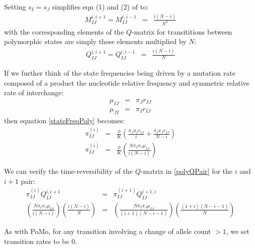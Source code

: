 \documentclass{llncs}
\newcommand{\polyProb}{\ensuremath{\phi}}}
\newcommand{\Knorm}{\ensuremath{K}}}
\newcommand{\pomo}{PoMo\xspace}
\begin{document}
Setting $s_I=s_J$ simplifies eqn (1) and (2) of \cite{DeMaioSK2013} to:
\begin{eqnarray}
 M_{IJ}^{i,i+1}  = M_{IJ}^{i,i-1} & = & \frac{i(N-i)}{N^2}
\end{eqnarray}
with the corresponding elements of the $Q$-matrix for 
    transititions between polymorphic states are simply
    these elements multiplied by $N$:
\begin{eqnarray}
    Q_{IJ}^{i,i+1}  = Q_{IJ}^{i,i-1} & = & \frac{i(N-i)}{N} \label{polyQPair}
\end{eqnarray}

If we further think of the state frequencies being driven by a mutation rate composed of a product
    the nucleotide relative frequency and symmetric relative rate of interchange:
\begin{eqnarray}
 \mu_{IJ} & = &\pi_J r_{IJ} \\
 \mu_{JI} & = &\pi_I r_{IJ} 
\end{eqnarray}
then equation \ref{stateFreqPoly} becomes:
\begin{eqnarray}
\pi_{IJ}^{(i)} & = & \frac{\polyProb}{\Knorm }\left( \frac{\pi_J\pi_I r_{IJ}}{i} + \frac{\pi_I\pi_J r_{IJ}}{N-i}\right) \nonumber\\
     \pi_{IJ}^{(i)} & = & \frac{\polyProb}{\Knorm }\left( \frac{N\pi_I\pi_J\mu_{IJ}}{i(N-i)}\right) \label{polyStateFreqSimplified}
\end{eqnarray}

We can verify the time-reversibility of the $Q$-matrix in \ref{polyQPair} for the $i$ and $i+1$ pair:
\begin{eqnarray}
    \pi_{IJ}^{(i)} Q_{IJ}^{i,i+1} & = & \pi_{IJ}^{(i+1)} Q_{IJ}^{i+1,i} \nonumber \\
    \left( \frac{N\pi_I\pi_J\mu_{IJ}}{i(N-i)}\right) \left(\frac{i(N-i)}{N}\right) & = & \left( \frac{N\pi_I\pi_J\mu_{IJ}}{(i+1)(N-i-1)}\right)\left(\frac{(1+i)(N-i-1)}{N}\right) \nonumber
\end{eqnarray}

As with \pomo, for any transition involving a change of allele count $>1$, we set transition rates to be 0.
\end{document}
